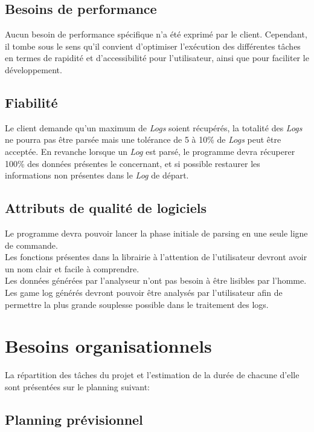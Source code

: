 \subsection{Besoins de performance}

Aucun besoin de performance spécifique n’a été exprimé par le client. Cependant, il tombe sous le sens qu'il convient d'optimiser l'exécution des différentes tâches en termes de rapidité et d'accessibilité pour l'utilisateur, ainsi que pour faciliter le développement.\\


\subsection{Fiabilité}
Le client demande qu'un maximum de \textit{Logs} soient récupérés, la totalité des \textit{Logs} ne pourra pas être parsée mais une tolérance de 5 à 10\% de \textit{Logs} peut être acceptée.\newline
En revanche lorsque un \textit{Log} est parsé, le programme devra récuperer 100\% des données présentes le concernant, et si possible restaurer les informations non présentes dans le \textit{Log} de départ.

\subsection{Attributs de qualité de logiciels}

Le programme devra pouvoir lancer la phase initiale de parsing en une seule ligne de commande.\\
Les fonctions présentes dans la librairie à l'attention de l'utilisateur devront avoir un nom clair et facile à comprendre.\\
Les données générées par l'analyseur n’ont pas besoin à être lisibles par l'homme.\\
Les game log générés devront pouvoir être analysés par l'utilisateur afin de permettre la plus grande souplesse possible dans le traitement des logs.

\section{Besoins organisationnels}

La répartition des tâches du projet et l'estimation de la durée de chacune d'elle sont présentées sur le planning suivant:\\

\subsection{Planning prévisionnel}

